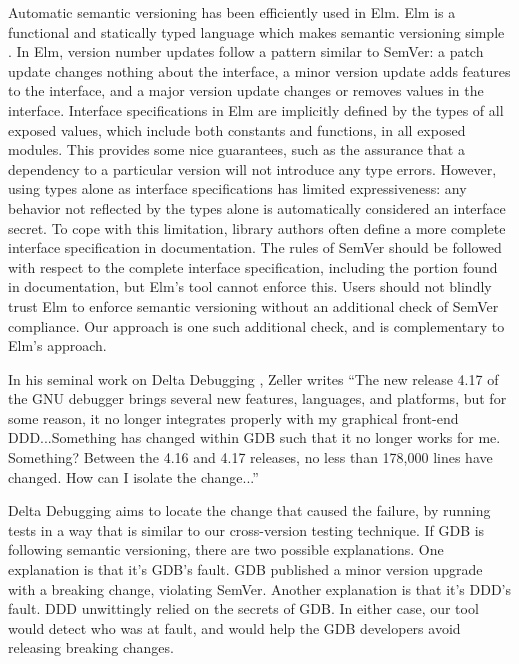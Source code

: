 Automatic semantic versioning has been efficiently used in
Elm\cite{elm-package}. Elm is a functional and statically typed language
which makes semantic versioning simple \cite{elm,czaplicki2012elm}. In
Elm, version number updates follow a pattern similar to SemVer: a patch
update changes nothing about the interface, a minor version update adds
features to the interface, and a major version update changes or removes
values in the interface.  Interface specifications in Elm are implicitly
defined by the types of all exposed values, which include both constants
and functions, in all exposed modules. This provides some nice
guarantees, such as the assurance that a dependency to a particular
version will not introduce any type errors.  However, using types alone
as interface specifications has limited expressiveness: any behavior not
reflected by the types alone is automatically considered an interface
secret. To cope with this limitation, library authors often define a
more complete interface specification in documentation. The rules of
SemVer should be followed with respect to the complete interface
specification, including the portion found in documentation, but Elm's
tool cannot enforce this.  Users should not blindly trust Elm to enforce
semantic versioning without an additional check of SemVer compliance.
Our approach is one such additional check, and is complementary to Elm's
approach.

In his seminal work on Delta Debugging \cite{zeller}, Zeller writes
``The new release 4.17 of the GNU debugger brings several new features,
languages, and platforms, but for some reason, it no longer integrates
properly with my graphical front-end DDD...Something has changed within
GDB such that it no longer works for me. Something?  Between the 4.16
and 4.17 releases, no less than 178,000 lines have changed. How can I
isolate the change...''

Delta Debugging aims to locate the change that caused the failure, by
running tests in a way that is similar to our cross-version testing
technique. If GDB is following semantic versioning, there are two
possible explanations. One explanation is that it's GDB's fault. GDB
published a minor version upgrade with a breaking change, violating
SemVer. Another explanation is that it's DDD's fault. DDD unwittingly
relied on the secrets of GDB. In either case, our tool would detect
who was at fault, and would help the GDB developers avoid releasing
breaking changes.

